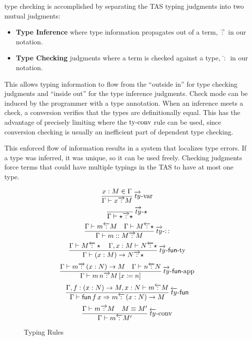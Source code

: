  
\Bidir{} type checking is accomplished by separating the \ac{TAS} typing judgments into two mutual judgments:
\begin{itemize}
\item \textbf{Type Inference} where type information propagates out of a term, $\overrightarrow{\,:\,}$ in our notation.
\item \textbf{Type Checking} judgments where a term is checked against a type, $\overleftarrow{\,:\,}$ in our notation.
\end{itemize}
This allows typing information to flow from the ``outside in'' for type checking judgments and ``inside out'' for the type inference judgments.
Check mode can be induced by the programmer with a type annotation.
When an inference meets a check, a conversion verifies that the types are definitionally equal.
This has the advantage of precisely limiting where the $\operatorname{ty-conv}$ rule can be used, since conversion checking is usually an inefficient part of dependent type checking.
 
This enforced flow of information results in a system that localizes type errors.
If a type was inferred, it was unique, so it can be used freely.
Checking judgments force terms that could have multiple typings in the \ac{TAS} to have at most one type.
 
\begin{figure}
\[
\frac{x:M\in\Gamma}{\Gamma\vdash x\overrightarrow{\,:\,}M}
\operatorname{\overrightarrow{ty}-var}
\]
\[
\frac{\,}{\Gamma\vdash\star\overrightarrow{\,:\,}\star}
\operatorname{\overrightarrow{ty}-\star}
\]
\[
\frac{\Gamma\vdash m\overleftarrow{\,:\,}M\quad\Gamma\vdash M\overleftarrow{\,:\,}\star}{\Gamma\vdash m::M\overrightarrow{\,:\,}M}
\operatorname{\overrightarrow{ty}-::}
\]
\[
\frac{\Gamma\vdash M\overleftarrow{\,:\,}\star\quad\Gamma,x:M\vdash N\overleftarrow{\,:\,}\star}{\Gamma\vdash\left(x:M\right)\rightarrow N\overrightarrow{\,:\,}\star}
\operatorname{\overrightarrow{ty}-\mathsf{fun}-ty}
\]
\[
\frac{\Gamma\vdash m\overrightarrow{\,:\,}\left(x:N\right)\rightarrow M\quad\Gamma\vdash n\overleftarrow{\,:\,}N}{\Gamma\vdash m\,n\overrightarrow{\,:\,}M\left[x\coloneqq n\right]}
\operatorname{\overrightarrow{ty}-\mathsf{fun}-app}
\]
\[
\frac{\Gamma,f:\left(x:N\right)\rightarrow M,x:N\vdash m\overleftarrow{\,:\,}M}{\Gamma\vdash\mathsf{fun}\,f\,x\Rightarrow m\overleftarrow{\,:\,}\left(x:N\right)\rightarrow M}
\operatorname{\overleftarrow{ty}-\mathsf{fun}}
\]
\[
\frac{\Gamma\vdash m\overrightarrow{\,:\,}M\quad M\equiv M'}{\Gamma\vdash m\overleftarrow{\,:\,}M'}
\operatorname{\overleftarrow{ty}-conv}
\]
 
\caption{\SLang{} \Bidir{} Typing Rules}
\label{fig:surface-bityping-rules}
\end{figure}
 
